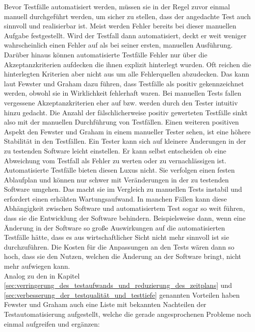 Bevor Testfälle automatisiert werden, müssen sie in der Regel zuvor einmal manuell durchgeführt werden, um sicher zu stellen, dass der angedachte Test auch sinnvoll und realisierbar ist. Meist werden Fehler bereits bei dieser manuellen Aufgabe festgestellt. Wird der Testfall dann automatisiert, deckt er weit weniger wahrscheinlich einen Fehler auf als bei seiner ersten, manuellen Ausführung. Darüber hinaus können automatisierte Testfälle Fehler nur über die Akzeptanzkriterien aufdecken die ihnen explizit hinterlegt wurden. Oft reichen die hinterlegten Kriterien aber nicht aus um alle Fehlerquellen abzudecken. Das kann laut Fewster und Graham \cite[vgl. S. 23 ff.]{fewster_software_1999} dazu führen, dass Testfälle als positiv gekennzeichnet werden, obwohl sie in Wirklichkeit fehlerhaft waren. Bei manuellen Tests fallen vergessene Akzeptanzkriterien eher auf bzw. werden durch den Tester intuitiv hinzu gedacht. Die Anzahl der fälschlicherweise positiv gewerteten Testfälle sinkt also mit der manuellen Durchführung von Testfällen. Einen weiteren positiven Aspekt den Fewster und Graham \cite[vgl. S. 24 ff.]{fewster_software_1999} in einem manueller Tester sehen, ist eine höhere Stabilität in den Testfällen. Ein Tester kann sich auf kleinere Änderungen in der zu testenden Software leicht einstellen. Er kann selbst entscheiden ob eine Abweichung vom Testfall als Fehler zu werten oder zu vernachlässigen ist. Automatisierte Testfälle bieten diesen Luxus nicht. Sie verfolgen einen festen Ablaufplan und können nur schwer mit Veränderungen in der zu testenden Software umgehen. Das macht sie im Vergleich zu manuellen Tests instabil und erfordert einen erhöhten Wartungsaufwand. In manchen Fällen kann diese Abhängigkeit zwischen Software und automatisiertem Test sogar so weit führen, dass sie die Entwicklung der Software behindern. Beispielsweise dann, wenn eine Änderung in der Software so große Auswirkungen auf die automatisierten Testfälle hätte, dass es aus wirtschaftlicher Sicht nicht mehr sinnvoll ist sie durchzuführen. Die Kosten für die Anpassungen an den Tests wären dann so hoch, dass sie den Nutzen, welchen die Änderung an der Software bringt, nicht mehr aufwiegen kann.\\
Analog zu den in Kapitel \ref{sec:verringerung_des_testaufwands_und_reduzierung_des_zeitplans} und \ref{sec:verbesserung_der_testqualität_und_testtiefe} genannten Vorteilen haben Fewster und Graham \cite[vgl. S. 10 ff.]{fewster_software_1999} auch eine Liste mit bekannten Nachteilen der Testautomatisierung aufgestellt, welche die gerade angesprochenen Probleme noch einmal aufgreifen und ergänzen:

